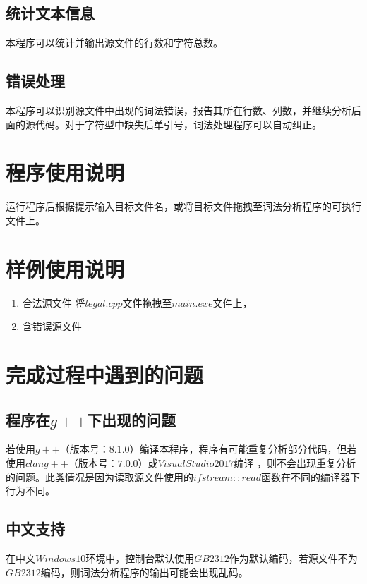 \documentclass[UTF8]{ctexart}
\begin{document}
\subsection{统计文本信息}
本程序可以统计并输出源文件的行数和字符总数。
\subsection{错误处理}
本程序可以识别源文件中出现的词法错误，报告其所在行数、列数，并继续分析后面的源代码。对于字符型中缺失后单引号，词法处理程序可以自动纠正。
\section{程序使用说明}
运行程序后根据提示输入目标文件名，或将目标文件拖拽至词法分析程序的可执行文件上。
\section{样例使用说明}
\begin{enumerate}
	\item 合法源文件
	将$legal.cpp$文件拖拽至$main.exe$文件上，
	\item 含错误源文件
\end{enumerate}
\section{完成过程中遇到的问题}
\subsection{程序在$g++$下出现的问题}
若使用$g++$（版本号：$8.1.0$）编译本程序，程序有可能重复分析部分代码，但若使用$clang++$（版本号：$7.0.0$）或$Visual Studio 2017$编译
，则不会出现重复分析的问题。此类情况是因为读取源文件使用的$ifstream::read$函数在不同的编译器下行为不同。
\subsection{中文支持}
在中文$Windows 10$环境中，控制台默认使用$GB2312$作为默认编码，若源文件不为$GB2312$编码，则词法分析程序的输出可能会出现乱码。
\end{document}
